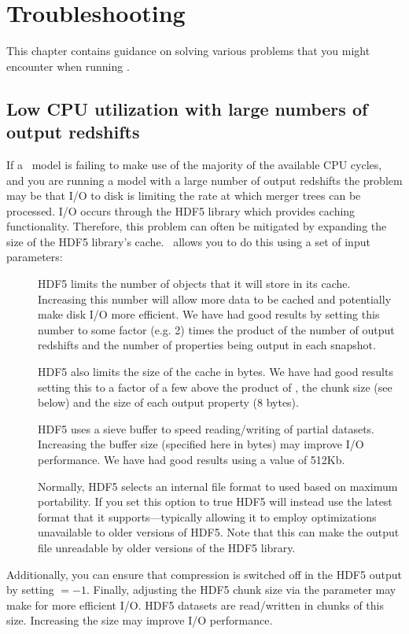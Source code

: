 \chapter{Troubleshooting}

This chapter contains guidance on solving various problems that you might encounter when running \glc.

\section{Low CPU utilization with large numbers of output redshifts}

If a \glc\ model is failing to make use of the majority of the available CPU cycles, and you are running a model with a large number of output redshifts the problem may be that I/O to disk is limiting the rate at which merger trees can be processed. I/O occurs through the HDF5 library which provides caching functionality. Therefore, this problem can often be mitigated by expanding the size of the HDF5 library's cache. \glc\ allows you to do this using a set of input parameters:
\begin{description}
\item[{\normalfont {}}] HDF5 limits the number of objects that it will store in its cache. Increasing this number will allow more data to be cached and potentially make disk I/O more efficient. We have had good results by setting this number to some factor (e.g. 2) times the product of the number of output redshifts and the number of properties being output in each snapshot.

\item[{\normalfont {}}] HDF5 also limits the size of the cache in bytes. We have had good results setting this to a factor of a few above the product of {\normalfont {}}, the chunk size (see below) and the size of each output property (8 bytes).

\item[{\normalfont {}}] HDF5 uses a sieve buffer to speed reading/writing of partial datasets. Increasing the buffer size (specified here in bytes) may improve I/O performance. We have had good results using a value of 512Kb.

\item[{\normalfont {}}] Normally, HDF5 selects an internal file format to used based on maximum portability. If you set this option to {\normalfont \ttfamily true} HDF5 will instead use the latest format that it supports---typically allowing it to employ optimizations unavailable to older versions of HDF5. Note that this can make the output file unreadable by older versions of the HDF5 library.
\end{description}
Additionally, you can ensure that compression is switched off in the HDF5 output by setting {\normalfont {}}$=-1$. Finally, adjusting the HDF5 chunk size via the {\normalfont {}} parameter may make for more efficient I/O. HDF5 datasets are read/written in chunks of this size. Increasing the size may improve I/O performance. 
